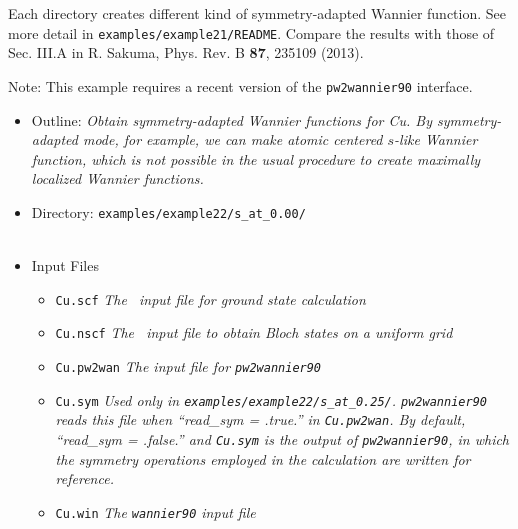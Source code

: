 \documentclass[a4paper,11pt,twoside]{article}
\begin{document}
Each directory creates different kind of symmetry-adapted Wannier function. 
See more detail in {\tt examples/example21/README}. 
Compare the results with those of Sec. III.A in R. Sakuma, Phys. Rev. B {\bf 87}, 235109 (2013). 




Note: This example requires a recent version of the {\tt pw2wannier90} interface.

\begin{itemize}
\item{Outline: \it{Obtain symmetry-adapted Wannier functions for Cu. By symmetry-adapted mode, for example, we can make atomic centered $s$-like Wannier function, which is not possible in the usual procedure to create maximally localized Wannier functions.}}
\item{Directory: {\tt examples/example22/s\_at\_0.00/} \\
\phantom{Directory: }{\tt examples/example22/s\_at\_0.25/}    \\
\phantom{Directory: }{\tt examples/example22/s\_at\_0.50/}    
}
\item{Input Files}
\begin{itemize}
\item{ {\tt Cu.scf}  {\it The \pwscf\ input file for ground state
    calculation}} 
\item{ {\tt Cu.nscf}  {\it The \pwscf\ input file to obtain Bloch
    states on a uniform grid}} 
\item{ {\tt Cu.pw2wan}  {\it The input file for {\tt pw2wannier90}}}
\item{ {\tt Cu.sym}  {\it Used only in {\tt examples/example22/s\_at\_0.25/}. {\tt pw2wannier90} reads this file when {\rm ``read\_sym = .true.''} in {\tt Cu.pw2wan}. By default, {\rm ``read\_sym = .false.'' and {\tt Cu.sym} is the output of {\tt pw2wannier90}}, in which the symmetry operations employed in the calculation are written for reference. } } 
\item{ {\tt Cu.win}  {\it The {\tt wannier90} input file}}
\end{itemize}
\end{itemize}
\end{document}
